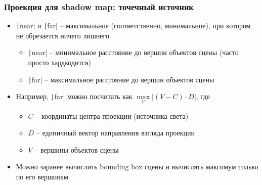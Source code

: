 \documentclass{beamer}
\begin{document}
\begin{frame}[fragile]
\frametitle{Проекция для shadow map: точечный источник}
\begin{itemize}
\item \texttt|near| и \texttt|far| -- максимальное (соответственно, минимальное), при котором не обрезается ничего лишнего
\pause
\begin{itemize}
\item \texttt|near| -- минимальное расстояние до вершин объектов сцены (часто просто хардкодится)
\item \texttt|far| -- максимальное расстояние до вершин объектов сцены
\end{itemize}
\pause
\item Например, \texttt|far| можно посчитать как \begin{math}\max\limits_V |(V - C) \cdot D|\end{math}, где
\begin{itemize}
\item \begin{math}C\end{math} -- координаты центра проекции (источника света)
\item \begin{math}D\end{math} -- единичный вектор направления взгляда проекции
\item \begin{math}V\end{math} -- вершины объектов сцены
\end{itemize}
\pause
\item Можно заранее вычислить bounding box сцены и вычислять максимум только по его вершинам
\end{itemize}
\end{frame}
\end{document}
